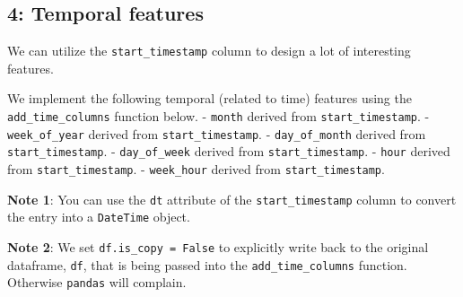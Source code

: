 \documentclass[11pt]{article}
\begin{document}
    \subsection{4: Temporal features}\label{temporal-features}

We can utilize the \texttt{start\_timestamp} column to design a lot of
interesting features.

    We implement the following temporal (related to time) features using the
\texttt{add\_time\_columns} function below. - \texttt{month} derived
from \texttt{start\_timestamp}. - \texttt{week\_of\_year} derived from
\texttt{start\_timestamp}. - \texttt{day\_of\_month} derived from
\texttt{start\_timestamp}. - \texttt{day\_of\_week} derived from
\texttt{start\_timestamp}. - \texttt{hour} derived from
\texttt{start\_timestamp}. - \texttt{week\_hour} derived from
\texttt{start\_timestamp}.

\textbf{Note 1}: You can use the \texttt{dt} attribute of the
\texttt{start\_timestamp} column to convert the entry into a
\texttt{DateTime} object.

\textbf{Note 2}: We set \texttt{df.is\_copy\ =\ False} to explicitly
write back to the original dataframe, \texttt{df}, that is being passed
into the \texttt{add\_time\_columns} function. Otherwise \texttt{pandas}
will complain.
\end{document}
